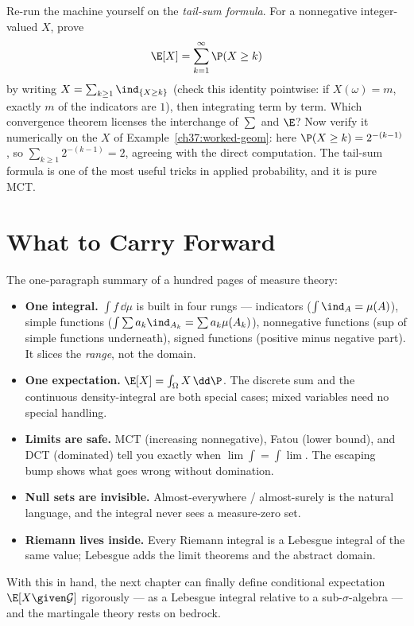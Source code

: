 \begin{labbox}
Re-run the machine yourself on the \emph{tail-sum formula}. For a nonnegative
integer-valued $X$, prove
\[
  \E[X]=\sum_{k=1}^\infty \P(X\ge k)
\]
by writing $X=\sum_{k\ge1}\ind_{\{X\ge k\}}$ (check this identity pointwise: if
$X(\omega)=m$, exactly $m$ of the indicators are $1$), then integrating term by
term. Which convergence theorem licenses the interchange of $\sum$ and $\E$? Now
verify it numerically on the $X$ of Example~\ref{ch37:worked-geom}: here
$\P(X\ge k)=2^{-(k-1)}$, so $\sum_{k\ge1}2^{-(k-1)}=2$, agreeing with the
direct computation. The tail-sum formula is one of the most useful tricks in
applied probability, and it is pure MCT.
\end{labbox}

\section{What to Carry Forward}

\begin{focusbox}
The one-paragraph summary of a hundred pages of measure theory:
\begin{itemize}
\item \textbf{One integral.} $\int f\,\dd\mu$ is built in four rungs ---
  indicators ($\int\ind_A=\mu(A)$), simple functions
  ($\int\sum a_k\ind_{A_k}=\sum a_k\mu(A_k)$), nonnegative functions
  (sup of simple functions underneath), signed functions (positive minus
  negative part). It slices the \emph{range}, not the domain.
\item \textbf{One expectation.} $\E[X]=\int_\Omega X\,\dd\P$. The discrete sum
  and the continuous density-integral are both special cases; mixed variables
  need no special handling.
\item \textbf{Limits are safe.} MCT (increasing nonnegative), Fatou (lower
  bound), and DCT (dominated) tell you exactly when $\lim\int=\int\lim$. The
  escaping bump shows what goes wrong without domination.
\item \textbf{Null sets are invisible.} Almost-everywhere / almost-surely is the
  natural language, and the integral never sees a measure-zero set.
\item \textbf{Riemann lives inside.} Every Riemann integral is a Lebesgue
  integral of the same value; Lebesgue adds the limit theorems and the abstract
  domain.
\end{itemize}
With this in hand, the next chapter can finally define conditional expectation
$\E[X\given\mathcal G]$ rigorously --- as a Lebesgue integral relative to a
sub-$\sigma$-algebra --- and the martingale theory rests on bedrock.
\end{focusbox}

